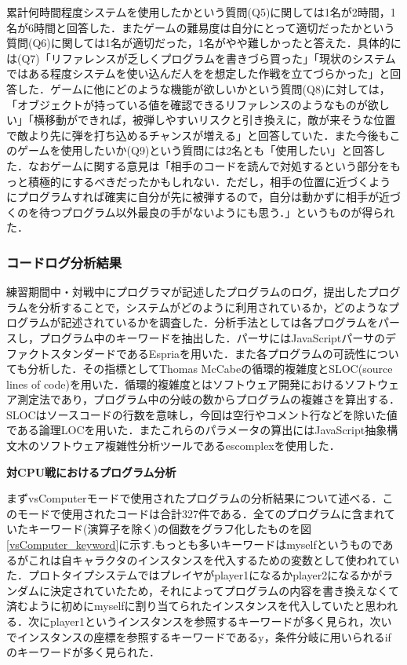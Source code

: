 累計何時間程度システムを使用したかという質問(Q5)に関しては1名が2時間，1名が6時間と回答した．またゲームの難易度は自分にとって適切だったかという質問(Q6)に関しては1名が適切だった，1名がやや難しかったと答えた．具体的には(Q7)「リファレンスが乏しくプログラムを書きづら買った」「現状のシステムではある程度システムを使い込んだ人をを想定した作戦を立てづらかった」と回答した．ゲームに他にどのような機能が欲しいかという質問(Q8)に対しては，「オブジェクトが持っている値を確認できるリファレンスのようなものが欲しい」「横移動ができれば，被弾しやすいリスクと引き換えに，敵が来そうな位置で敵より先に弾を打ち込めるチャンスが増える」と回答していた．また今後もこのゲームを使用したいか(Q9)という質問には2名とも「使用したい」と回答した．なおゲームに関する意見は「相手のコードを読んで対処するという部分をもっと積極的にするべきだったかもしれない．ただし，相手の位置に近づくようにプログラムすれば確実に自分が先に被弾するので，自分は動かずに相手が近づくのを待つプログラム以外最良の手がないようにも思う．」というものが得られた．

\subsubsection{コードログ分析結果}

練習期間中・対戦中にプログラマが記述したプログラムのログ，提出したプログラムを分析することで，システムがどのように利用されているか，どのようなプログラムが記述されているかを調査した．分析手法としては各プログラムをパースし，プログラム中のキーワードを抽出した．パーサにはJavaScriptパーサのデファクトスタンダードであるEspria\cite{esprima}を用いた．また各プログラムの可読性についても分析した．その指標としてThomas McCabeの循環的複雑度\cite{complexity}とSLOC(source lines of code)を用いた．循環的複雑度とはソフトウェア開発におけるソフトウェア測定法であり，プログラム中の分岐の数からプログラムの複雑さを算出する．SLOCはソースコードの行数を意味し，今回は空行やコメント行などを除いた値である論理LOCを用いた．またこれらのパラメータの算出にはJavaScript抽象構文木のソフトウェア複雑性分析ツールであるescomplex\cite{escomplex}を使用した．

\vspace{10truept}
\noindent
{\bf 対CPU戦におけるプログラム分析}

まずvsComputerモードで使用されたプログラムの分析結果について述べる．このモードで使用されたコードは合計327件である．全てのプログラムに含まれていたキーワード(演算子を除く)の個数をグラフ化したものを図\ref{vsComputer_keyword}に示す.もっとも多いキーワードはmyselfというものであるがこれは自キャラクタのインスタンスを代入するための変数として使われていた．プロトタイプシステムではプレイヤがplayer1になるかplayer2になるかがランダムに決定されていたため，それによってプログラムの内容を書き換えなくて済むように初めにmyselfに割り当てられたインスタンスを代入していたと思われる．次にplayer1というインスタンスを参照するキーワードが多く見られ，次いでインスタンスの座標を参照するキーワードであるy，条件分岐に用いられるifのキーワードが多く見られた．

